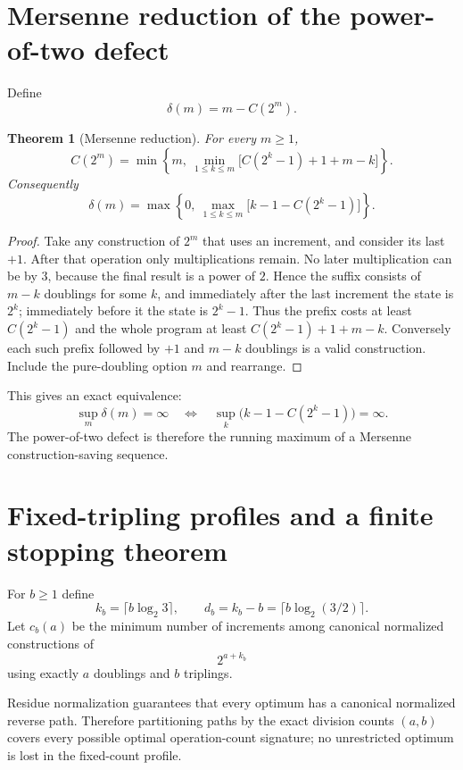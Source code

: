 \documentclass[11pt]{article}
\newtheorem{theorem}{Theorem}[section]
\begin{document}
\section{Mersenne reduction of the power-of-two defect}
Define
\[
 \delta(m)=m-C(2^m).
\]
\begin{theorem}[Mersenne reduction]\label{thm:mersenne}
For every $m\ge1$,
\[
 \boxed{
 C(2^m)=\min\left\{m,\ \min_{1\le k\le m}\bigl[C(2^k-1)+1+m-k\bigr]\right\}.}
\]
Consequently
\[
 \boxed{
 \delta(m)=\max\left\{0,\ \max_{1\le k\le m}\bigl[k-1-C(2^k-1)\bigr]\right\}.}
\]
\end{theorem}
\begin{proof}
Take any construction of $2^m$ that uses an increment, and consider its last $+1$. After that operation only multiplications remain. No later multiplication can be by $3$, because the final result is a power of $2$. Hence the suffix consists of $m-k$ doublings for some $k$, and immediately after the last increment the state is $2^k$; immediately before it the state is $2^k-1$. Thus the prefix costs at least $C(2^k-1)$ and the whole program at least $C(2^k-1)+1+m-k$. Conversely each such prefix followed by $+1$ and $m-k$ doublings is a valid construction. Include the pure-doubling option $m$ and rearrange.
\end{proof}

This gives an exact equivalence:
\[
 \boxed{\sup_m\delta(m)=\infty\quad\Longleftrightarrow\quad
 \sup_k\bigl(k-1-C(2^k-1)\bigr)=\infty.}
\]
The power-of-two defect is therefore the running maximum of a Mersenne construction-saving sequence.

\section{Fixed-tripling profiles and a finite stopping theorem}
For $b\ge1$ define
\[
 k_b=\lceil b\log_2 3\rceil,
 \qquad d_b=k_b-b=\lceil b\log_2(3/2)\rceil.
\]
Let $c_b(a)$ be the minimum number of increments among canonical normalized constructions of
\[
 2^{a+k_b}
\]
using exactly $a$ doublings and $b$ triplings.

Residue normalization guarantees that every optimum has a canonical normalized reverse path. Therefore partitioning paths by the exact division counts $(a,b)$ covers every possible optimal operation-count signature; no unrestricted optimum is lost in the fixed-count profile.
\end{document}
